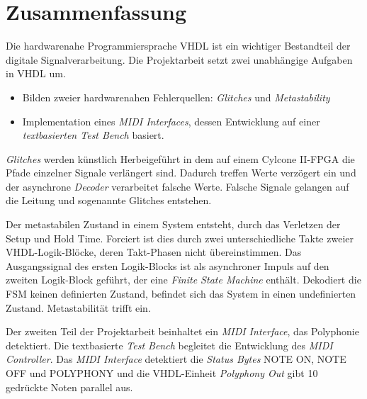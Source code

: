 
\chapter*{Zusammenfassung}


Die hardwarenahe Programmiersprache VHDL ist ein wichtiger Bestandteil der digitale Signalverarbeitung. Die Projektarbeit setzt zwei unabhängige Aufgaben in VHDL um.

\begin{itemize}
\item Bilden zweier hardwarenahen Fehlerquellen: \textit{Glitches} und \textit{Metastability}
	\item Implementation eines \textit{MIDI Interfaces}, dessen Entwicklung auf einer \textit{textbasierten Test Bench} basiert.
\end{itemize} 

\textit{Glitches} werden künstlich Herbeigeführt in dem auf einem Cylcone II-FPGA die Pfade einzelner Signale verlängert sind. Dadurch treffen Werte verzögert ein und der asynchrone \textit{Decoder} verarbeitet falsche Werte. Falsche Signale gelangen auf die Leitung und sogenannte Glitches entstehen. 

Der metastabilen Zustand in einem System entsteht, durch das Verletzen der Setup und Hold Time. Forciert ist dies durch zwei unterschiedliche Takte zweier VHDL-Logik-Blöcke, deren Takt-Phasen nicht übereinstimmen. Das Ausgangssignal des ersten Logik-Blocks ist als asynchroner Impuls auf den zweiten Logik-Block geführt, der eine \textit{Finite State Machine} enthält. Dekodiert die FSM keinen definierten Zustand, befindet sich das System in einen undefinierten Zustand. Metastabilität trifft ein.

Der zweiten Teil der Projektarbeit beinhaltet ein \textit{MIDI Interface}, das Polyphonie detektiert. Die textbasierte \textit{Test Bench} begleitet die Entwicklung des \textit{MIDI Controller}. Das \textit{MIDI Interface} detektiert die \textit{Status Bytes} NOTE ON, NOTE OFF und POLYPHONY und die VHDL-Einheit \textit{Polyphony Out} gibt 10 gedrückte Noten parallel aus.
